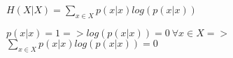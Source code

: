 \documentclass[../main.tex]{subfiles}
\begin{document}
$H(X|X) = \sum\limits_{x \in X} p(x|x)log(p(x|x))$

$p(x|x) = 1 => log(p(x|x))=0\ \forall x \in X =>$ $\sum\limits_{x \in X} p(x|x)log(p(x|x)) = 0$
\end{document}
